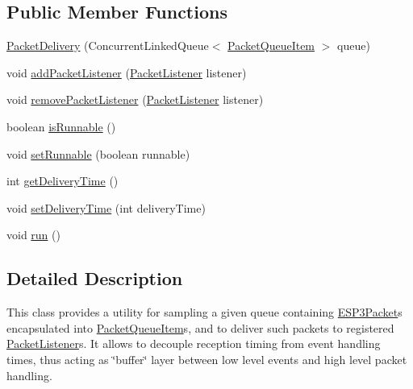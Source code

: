 \subsection*{Public Member Functions}
\begin{DoxyCompactItemize}
\item 
\hyperlink{classit_1_1polito_1_1elite_1_1enocean_1_1enj_1_1link_1_1_packet_delivery_a0c92fe58435e83413e79c68a544094d8}{Packet\+Delivery} (Concurrent\+Linked\+Queue$<$ \hyperlink{classit_1_1polito_1_1elite_1_1enocean_1_1enj_1_1link_1_1_packet_queue_item}{Packet\+Queue\+Item} $>$ queue)
\item 
void \hyperlink{classit_1_1polito_1_1elite_1_1enocean_1_1enj_1_1link_1_1_packet_delivery_a44fcf99d637f82a25569dacccb540d0e}{add\+Packet\+Listener} (\hyperlink{interfaceit_1_1polito_1_1elite_1_1enocean_1_1enj_1_1link_1_1_packet_listener}{Packet\+Listener} listener)
\item 
void \hyperlink{classit_1_1polito_1_1elite_1_1enocean_1_1enj_1_1link_1_1_packet_delivery_aaf82bdb31064c39afa204baeca13e465}{remove\+Packet\+Listener} (\hyperlink{interfaceit_1_1polito_1_1elite_1_1enocean_1_1enj_1_1link_1_1_packet_listener}{Packet\+Listener} listener)
\item 
boolean \hyperlink{classit_1_1polito_1_1elite_1_1enocean_1_1enj_1_1link_1_1_packet_delivery_a63000ebd64275044cf47d1c06efe21c6}{is\+Runnable} ()
\item 
void \hyperlink{classit_1_1polito_1_1elite_1_1enocean_1_1enj_1_1link_1_1_packet_delivery_abefdd50b0c4a4287620aa80f75ee9dee}{set\+Runnable} (boolean runnable)
\item 
int \hyperlink{classit_1_1polito_1_1elite_1_1enocean_1_1enj_1_1link_1_1_packet_delivery_a14a03532d13f84bfa692f0f786546416}{get\+Delivery\+Time} ()
\item 
void \hyperlink{classit_1_1polito_1_1elite_1_1enocean_1_1enj_1_1link_1_1_packet_delivery_aa707d7801da7137ddfc2f40d588fbee8}{set\+Delivery\+Time} (int delivery\+Time)
\item 
void \hyperlink{classit_1_1polito_1_1elite_1_1enocean_1_1enj_1_1link_1_1_packet_delivery_ababc40b5a33ae9f994d2fb3c0ad3095b}{run} ()
\end{DoxyCompactItemize}


\subsection{Detailed Description}
This class provides a utility for sampling a given queue containing \hyperlink{}{E\+S\+P3\+Packet}s encapsulated into \hyperlink{classit_1_1polito_1_1elite_1_1enocean_1_1enj_1_1link_1_1_packet_queue_item}{Packet\+Queue\+Item}s, and to deliver such packets to registered \hyperlink{interfaceit_1_1polito_1_1elite_1_1enocean_1_1enj_1_1link_1_1_packet_listener}{Packet\+Listener}s. It allows to decouple reception timing from event handling times, thus acting as \char`\"{}buffer\char`\"{} layer between low level events and high level packet handling.

